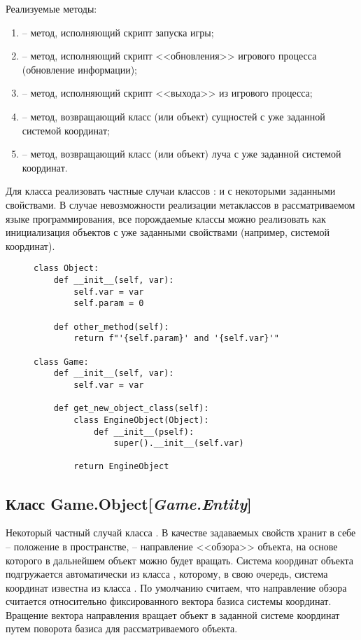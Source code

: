	\noindent Реализуемые методы:
	\begin{enumerate}
		\item {} -- метод, исполняющий скрипт запуска игры;
		\item {} -- метод, исполняющий скрипт <<обновления>> игрового процесса (обновление информации);
		\item {} -- метод, исполняющий скрипт <<выхода>> из игрового процесса;
		\item {} -- метод, возвращающий класс (или объект) сущностей с уже заданной системой координат;
		\item {} -- метод, возвращающий класс (или объект) луча с уже заданной системой координат.
	\end{enumerate}

Для класса  реализовать частные случаи классов :  и  с некоторыми заданными свойствами. В случае невозможности реализации метаклассов в рассматриваемом языке программирования, все порождаемые классы можно реализовать как инициализация объектов с уже заданными свойствами (например, системой координат).

\begin{figure}[H]
\begin{lstlisting}[caption=Пример кода реализации создания класса со значением по умолчанию]
class Object:
	def __init__(self, var):
		self.var = var
		self.param = 0

	def other_method(self):
		return f"'{self.param}' and '{self.var}'"

class Game:
	def __init__(self, var):
		self.var = var

	def get_new_object_class(self):
		class EngineObject(Object):
			def __init__(pself):
				super().__init__(self.var)

		return EngineObject
\end{lstlisting}
\end{figure}


\subsection{Класс Game.Object[\textit{Game.Entity}]}
	\noindent Некоторый частный случай класса . В качестве задаваемых свойств хранит в себе  -- положение в пространстве,  -- направление <<обзора>> объекта, на основе которого в дальнейшем объект можно будет вращать. Система координат объекта подгружается автоматически из класса , которому, в свою очередь, система координат известна из класса . По умолчанию считаем, что направление обзора считается относительно фиксированного вектора базиса системы координат. Вращение вектора направления вращает объект в заданной системе координат путем поворота базиса для рассматриваемого объекта.

